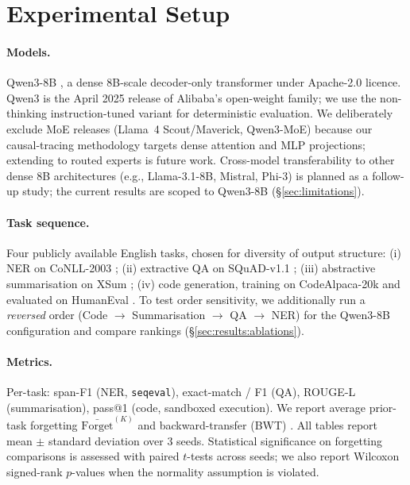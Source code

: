 \section{Experimental Setup}
\label{sec:experiments}

\paragraph{Models.} Qwen3-8B \citep{qwen3}, a dense 8B-scale decoder-only transformer under Apache-2.0 licence. Qwen3 is the April 2025 release of Alibaba's open-weight family; we use the non-thinking instruction-tuned variant for deterministic evaluation. We deliberately exclude MoE releases (Llama~4 Scout/Maverick, Qwen3-MoE) because our causal-tracing methodology targets dense attention and MLP projections; extending \fvs{} to routed experts is future work. Cross-model transferability to other dense 8B architectures (e.g., Llama-3.1-8B, Mistral, Phi-3) is planned as a follow-up study; the current results are scoped to Qwen3-8B (\S\ref{sec:limitations}).

\paragraph{Task sequence.} Four publicly available English tasks, chosen for diversity of output structure: (i) NER on CoNLL-2003 \citep{sang2003conll}; (ii) extractive QA on SQuAD-v1.1 \citep{rajpurkar2016squad}; (iii) abstractive summarisation on XSum \citep{narayan2018xsum}; (iv) code generation, training on CodeAlpaca-20k \citep{codealpaca} and evaluated on HumanEval \citep{chen2021humaneval}. To test order sensitivity, we additionally run a \textit{reversed} order (Code $\rightarrow$ Summarisation $\rightarrow$ QA $\rightarrow$ NER) for the Qwen3-8B configuration and compare \fvs{} rankings (\S\ref{sec:results:ablations}).

\paragraph{Metrics.} Per-task: span-F1 (NER, \texttt{seqeval}), exact-match / F1 (QA), ROUGE-L (summarisation), pass@1 (code, sandboxed execution). We report average prior-task forgetting $\bar{\mathrm{Forget}}^{(K)}$ and backward-transfer (BWT) \citep{lopez2017gem}. All tables report mean $\pm$ standard deviation over 3 seeds. Statistical significance on forgetting comparisons is assessed with paired $t$-tests across seeds; we also report Wilcoxon signed-rank $p$-values when the normality assumption is violated.

